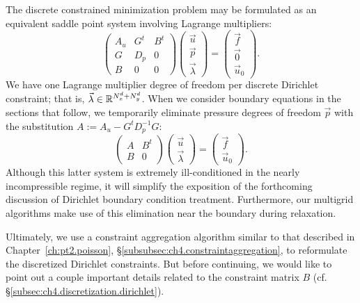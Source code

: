 The discrete constrained minimization problem may be formulated as an equivalent saddle point system involving Lagrange multipliers:
\begin{equation} \label{eq:ch5.kkt.augmented}
\begin{pmatrix} A_u & G^t & B^t \\ G & D_p & 0 \\ B & 0 & 0 \end{pmatrix}
\begin{pmatrix} \vec{u} \\ \vec{p} \\ \vec{\lambda} \end{pmatrix}
= \begin{pmatrix} \vec{f} \\ \vec{0} \\ \vec{u}_0 \end{pmatrix}.
\end{equation}
We have one Lagrange multiplier degree of freedom per discrete Dirichlet constraint; that is, $\vec{\lambda} \in \mathbb{R}^{N^d_x + N^d_y}$. When we consider boundary equations in the sections that follow, we temporarily eliminate pressure degrees of freedom $\vec{p}$ with the substitution $A := A_u - G^t D_p^{-1} G$:
\begin{equation} \label{eq:ch5.kkt.unaugmented}
\begin{pmatrix} A & B^t \\ B & 0 \end{pmatrix}
\begin{pmatrix} \vec{u} \\ \vec{\lambda} \end{pmatrix}
= \begin{pmatrix} \vec{f} \\ \vec{u}_0 \end{pmatrix}.
\end{equation}
Although this latter system is extremely ill-conditioned in the nearly incompressible regime, it will simplify the exposition of the forthcoming discussion of Dirichlet boundary condition treatment. Furthermore, our multigrid algorithms make use of this elimination near the boundary during relaxation.

Ultimately, we use a constraint aggregation algorithm similar to that described in Chapter~\ref{ch:pt2.poisson}, \S\ref{subsubsec:ch4.constraintaggregation}, to reformulate the discretized Dirichlet constraints. But before continuing, we would like to point out a couple important details related to the constraint matrix $B$ (cf. \S\ref{subsec:ch4.discretization.dirichlet}).

